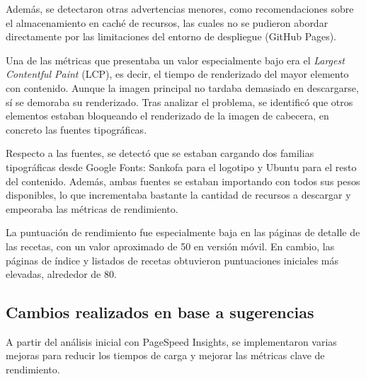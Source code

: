 \documentclass{article}
\begin{document}
Además, se detectaron otras advertencias menores, como recomendaciones sobre el almacenamiento en caché de recursos, las cuales no se pudieron abordar directamente por las limitaciones del entorno de despliegue (GitHub Pages).

Una de las métricas que presentaba un valor especialmente bajo era el \textit{Largest Contentful Paint} (LCP), es decir, el tiempo de renderizado del mayor elemento con contenido. Aunque la imagen principal no tardaba demasiado en descargarse, sí se demoraba su renderizado. Tras analizar el problema, se identificó que otros elementos estaban bloqueando el renderizado de la imagen de cabecera, en concreto las fuentes tipográficas.

Respecto a las fuentes, se detectó que se estaban cargando dos familias tipográficas desde Google Fonts: Sankofa para el logotipo y Ubuntu para el resto del contenido. Además, ambas fuentes se estaban importando con todos sus pesos disponibles, lo que incrementaba bastante la cantidad de recursos a descargar y empeoraba las métricas de rendimiento.

La puntuación de rendimiento fue especialmente baja en las páginas de detalle de las recetas, con un valor aproximado de 50 en versión móvil. En cambio, las páginas de índice y listados de recetas obtuvieron puntuaciones iniciales más elevadas, alrededor de 80.

\subsection{Cambios realizados en base a sugerencias}\label{subsec:cambios-realizados}

A partir del análisis inicial con PageSpeed Insights, se implementaron varias mejoras para reducir los tiempos de carga y mejorar las métricas clave de rendimiento.
\end{document}

